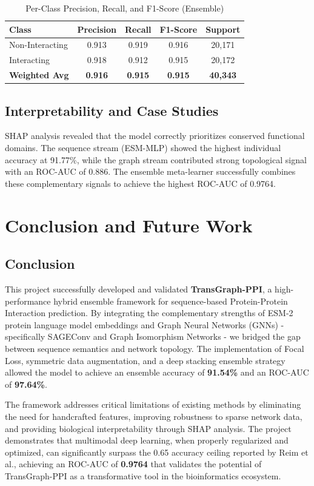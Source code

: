 \documentclass[12pt,a4paper]{report}
\begin{document}
\begin{table}[H]
\centering
\caption{Per-Class Precision, Recall, and F1-Score (Ensemble)}
\begin{tabular}{|l|c|c|c|c|}
\hline
\textbf{Class} & \textbf{Precision} & \textbf{Recall} & \textbf{F1-Score} & \textbf{Support} \\ \hline
Non-Interacting & 0.913 & 0.919 & 0.916 & 20,171 \\ \hline
Interacting & 0.918 & 0.912 & 0.915 & 20,172 \\ \hline
\textbf{Weighted Avg} & \textbf{0.916} & \textbf{0.915} & \textbf{0.915} & \textbf{40,343} \\ \hline
\end{tabular}
\end{table}

\section{Interpretability and Case Studies}
SHAP analysis revealed that the model correctly prioritizes conserved functional domains. The sequence stream (ESM-MLP) showed the highest individual accuracy at 91.77\%, while the graph stream contributed strong topological signal with an ROC-AUC of 0.886. The ensemble meta-learner successfully combines these complementary signals to achieve the highest ROC-AUC of 0.9764.

\chapter{Conclusion and Future Work}
\section{Conclusion}
This project successfully developed and validated \textbf{TransGraph-PPI}, a high-performance hybrid ensemble framework for sequence-based Protein-Protein Interaction prediction. By integrating the complementary strengths of ESM-2 protein language model embeddings and Graph Neural Networks (GNNs) - specifically SAGEConv and Graph Isomorphism Networks - we bridged the gap between sequence semantics and network topology. The implementation of Focal Loss, symmetric data augmentation, and a deep stacking ensemble strategy allowed the model to achieve an ensemble accuracy of \textbf{91.54\%} and an ROC-AUC of \textbf{97.64\%}.

The framework addresses critical limitations of existing methods by eliminating the need for handcrafted features, improving robustness to sparse network data, and providing biological interpretability through SHAP analysis. The project demonstrates that multimodal deep learning, when properly regularized and optimized, can significantly surpass the 0.65 accuracy ceiling reported by Reim et al., achieving an ROC-AUC of \textbf{0.9764} that validates the potential of TransGraph-PPI as a transformative tool in the bioinformatics ecosystem.
\end{document}
